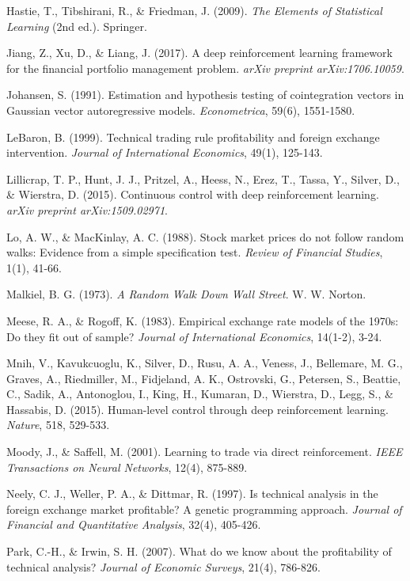 \documentclass[12pt,a4paper]{article}
\begin{document}
Hastie, T., Tibshirani, R., \& Friedman, J. (2009). \textit{The Elements of Statistical Learning} (2nd ed.). Springer.

Jiang, Z., Xu, D., \& Liang, J. (2017). A deep reinforcement learning framework for the financial portfolio management problem. \textit{arXiv preprint arXiv:1706.10059}.

Johansen, S. (1991). Estimation and hypothesis testing of cointegration vectors in Gaussian vector autoregressive models. \textit{Econometrica}, 59(6), 1551-1580.

LeBaron, B. (1999). Technical trading rule profitability and foreign exchange intervention. \textit{Journal of International Economics}, 49(1), 125-143.

Lillicrap, T. P., Hunt, J. J., Pritzel, A., Heess, N., Erez, T., Tassa, Y., Silver, D., \& Wierstra, D. (2015). Continuous control with deep reinforcement learning. \textit{arXiv preprint arXiv:1509.02971}.

Lo, A. W., \& MacKinlay, A. C. (1988). Stock market prices do not follow random walks: Evidence from a simple specification test. \textit{Review of Financial Studies}, 1(1), 41-66.

Malkiel, B. G. (1973). \textit{A Random Walk Down Wall Street}. W. W. Norton.

Meese, R. A., \& Rogoff, K. (1983). Empirical exchange rate models of the 1970s: Do they fit out of sample? \textit{Journal of International Economics}, 14(1-2), 3-24.

Mnih, V., Kavukcuoglu, K., Silver, D., Rusu, A. A., Veness, J., Bellemare, M. G., Graves, A., Riedmiller, M., Fidjeland, A. K., Ostrovski, G., Petersen, S., Beattie, C., Sadik, A., Antonoglou, I., King, H., Kumaran, D., Wierstra, D., Legg, S., \& Hassabis, D. (2015). Human-level control through deep reinforcement learning. \textit{Nature}, 518, 529-533.

Moody, J., \& Saffell, M. (2001). Learning to trade via direct reinforcement. \textit{IEEE Transactions on Neural Networks}, 12(4), 875-889.

Neely, C. J., Weller, P. A., \& Dittmar, R. (1997). Is technical analysis in the foreign exchange market profitable? A genetic programming approach. \textit{Journal of Financial and Quantitative Analysis}, 32(4), 405-426.

Park, C.-H., \& Irwin, S. H. (2007). What do we know about the profitability of technical analysis? \textit{Journal of Economic Surveys}, 21(4), 786-826.
\end{document}
